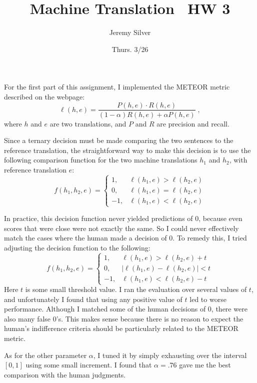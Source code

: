 \documentclass[11pt, oneside]{article}      %
\title{Machine Translation \textemdash \, HW 3}
\author{Jeremy Silver}
\date{Thurs. 3/26}                          %
\begin{document}
\maketitle

For the first part of this assignment, I implemented the METEOR metric described on the webpage:
\[ \ell(h, e)= \frac{P(h, e) \cdot R(h, e)}{(1 - \alpha)R(h, e) + \alpha P(h, e)}  \; , \]
where $h$ and $e$ are two translations, and $P$ and $R$ are precision and recall.

Since a ternary decision must be made comparing the two sentences to the reference translation, the straightforward way to make this decision is to use the following comparison function for the two machine translations $h_1$ and $h_2$, with reference translation $e$:
\[
f(h_1, h_2, e) = \left \{
\begin{array}{rl}
1, & \ell(h_1, e) > \ell(h_2, e) \\
0, & \ell(h_1, e) = \ell(h_2, e) \\
-1, & \ell(h_1, e) < \ell(h_2, e)
\end{array}
\right.
\]

In practice, this decision function never yielded predictions of 0, because even scores that were close were not exactly the same.  So I could never effectively match the cases where the human made a decision of 0.  To remedy this, I tried  adjusting the decision function to the following:
\[
f(h_1, h_2, e) = \left \{
\begin{array}{rl}
1, & \ell(h_1, e) > \ell(h_2, e) + t \\
0, & |\ell(h_1, e) - \ell(h_2, e)| < t \\
-1, & \ell(h_1, e) < \ell(h_2, e) - t
\end{array}
\right.
\]
Here $t$ is some small threshold value.  I ran the evaluation over several values of $t$, and unfortunately I found that using any positive value of $t$ led to worse performance.  Although I matched some of the human decisions of 0, there were also many false 0's.  This makes sense because there is no reason to expect the human's indifference criteria should be particularly related to the METEOR metric.

As for the other parameter $\alpha$, I tuned it by simply exhausting over the interval $[0, 1]$ using some small increment.  I found that $\alpha = .76$ gave me the best comparison with the human judgments.
\end{document}
